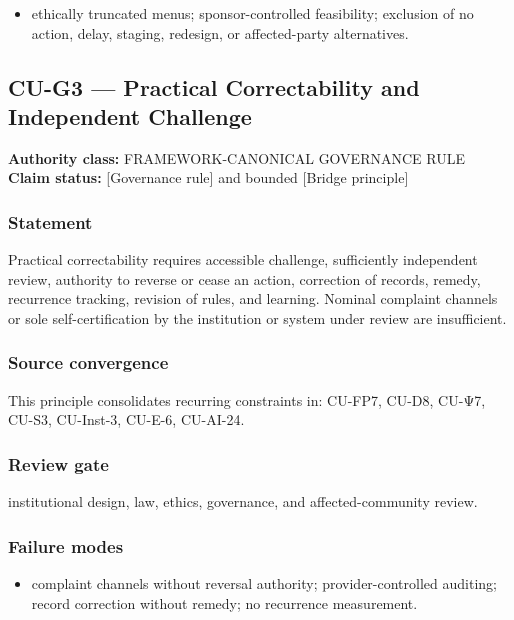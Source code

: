 \documentclass[
  11pt,
]{article}
\providecommand{\tightlist}{%
  \setlength{\itemsep}{0pt}\setlength{\parskip}{0pt}}
\begin{document}
\begin{itemize}
\tightlist
\item
  ethically truncated menus; sponsor-controlled feasibility; exclusion
  of no action, delay, staging, redesign, or affected-party
  alternatives.
\end{itemize}

\subsection{CU-G3 --- Practical Correctability and Independent
Challenge}\label{cu-g3-practical-correctability-and-independent-challenge}

\textbf{Authority class:} FRAMEWORK-CANONICAL GOVERNANCE RULE\\
\textbf{Claim status:} {[}Governance rule{]} and bounded {[}Bridge
principle{]}

\subsubsection{Statement}\label{statement-53}

Practical correctability requires accessible challenge, sufficiently
independent review, authority to reverse or cease an action, correction
of records, remedy, recurrence tracking, revision of rules, and
learning. Nominal complaint channels or sole self-certification by the
institution or system under review are insufficient.

\subsubsection{Source convergence}\label{source-convergence-2}

This principle consolidates recurring constraints in: CU-FP7, CU-D8,
CU-Ψ7, CU-S3, CU-Inst-3, CU-E-6, CU-AI-24.

\subsubsection{Review gate}\label{review-gate-9}

institutional design, law, ethics, governance, and affected-community
review.

\subsubsection{Failure modes}\label{failure-modes-26}

\begin{itemize}
\tightlist
\item
  complaint channels without reversal authority; provider-controlled
  auditing; record correction without remedy; no recurrence measurement.
\end{itemize}
\end{document}
